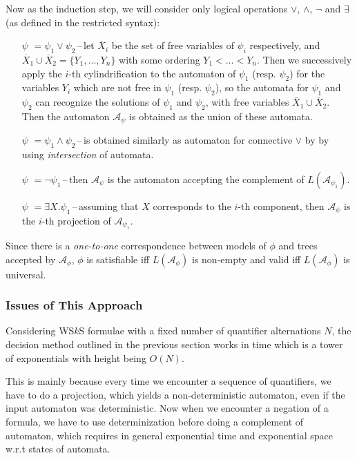 Now as the induction step, we will consider only logical operations $\vee$,
$\wedge$, $\neg$ and $\exists$ (as defined in the restricted syntax):
\begin{itemize}
 \item[$\psi$]$ = \psi_1 \vee \psi_2$\,--\,let $\overline{X}_i$ be the set of
 free variables of $\psi_i$ respectively, and $\overline{X}_1 \cup
 \overline{X}_2 = \{Y_1,\ldots,Y_n\}$ with some ordering $Y_1 < \ldots < Y_n$.
 Then we successively apply the $i$-th cylindrification to the automaton of
 $\psi_1$ (resp. $\psi_2$) for the variables $Y_i$ which are not free in
 $\psi_1$ (resp. $\psi_2$), so the automata for $\psi_1$ and $\psi_2$ can
 recognize the solutions of $\psi_1$ and $\psi_2$, with free variables
 $\overline{X}_1 \cup \overline{X}_2$. Then the automaton $\mathcal{A}_\psi$ is
 obtained as the union of these automata.
 \item[$\psi$]$ = \psi_1 \wedge \psi_2$\,--\,is obtained similarly as automaton
 for connective $\vee$ by by using \emph{intersection} of automata.
 \item[$\psi$]$ = \neg\psi_1$\,--\,then $\mathcal{A}_\psi$ is the automaton
 accepting the complement of $L(\mathcal{A}_{\psi_1})$.
 \item[$\psi$]$ = \exists X.\psi_1$\,--\,assuming that $X$ corresponds to the
 $i$-th component, then $\mathcal{A}_\psi$ is the $i$-th projection of
 $\mathcal{A}_{\psi_1}$.
\end{itemize}

\begin{prop}
 Since there is a \emph{one-to-one} correspondence between models of $\phi$ and
 trees accepted by $\mathcal{A}_\phi$, $\phi$ is satisfiable iff
 $L(\mathcal{A}_\phi)$ is non-empty and valid iff $L(\mathcal{A}_\phi)$  is
 universal.
\end{prop}

\subsubsection{Issues of This Approach}

Considering WS$k$S formulae with a fixed number of quantifier alternations $N$,
the decision method outlined in the previous section works in time which is a
tower of exponentials with height being $O(N)$.

This is mainly because every time we encounter a sequence of quantifiers, we
have to do a projection, which yields a non-deterministic automaton, even if the
input automaton was deterministic. Now when we encounter a negation of a
formula, we have to use determinization before doing a complement of automaton,
which requires in general exponential time and exponential space w.r.t states of
automata.

